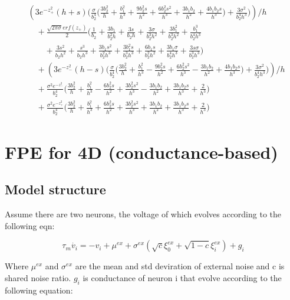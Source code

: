\documentclass{article}
\begin{document}
\begin{align}
	&(3 e^{-z_+^2}
	(h+s)
	\Big(
	\frac{\sigma}{b_2^4}
	\big(
	\frac{3 b_2^2}{h}
	+ \frac{b_1^2}{h^3}
	+ \frac{9 b_2^2 s}{h^2}
	+ \frac{6 b_2^2 s^2}{h^3}
	+ \frac{3 b_1 b_2}{h^2}
	+ \frac{4 b_1 b_2 s}{h^3}
	\big)
	+ \frac{3\sigma^2}{b_2^4 h^3}
	\Big)
	)/h
	\\[4pt]
		&\quad
	+ \frac{\sqrt{2\pi\sigma
			}erf(z_+)}
	{2}
	\Big(
	\frac{1}{b_2}
	+ \frac{3 b_1}{b_2^2 h}
	+ \frac{3 s}{b_2 h}
	+ \frac{3\sigma}{b_2^3 h^2}
	+ \frac{3 b_1^2}{b_2^3 h^2}
	+ \frac{b_1^3}{b_2^4 h^3}
	\\
	&\qquad
	+ \frac{3 s^2}{b_2 h^2}
	+ \frac{s^3}{b_2 h^3}
	+ \frac{3 b_1 s^2}{b_2^2 h^3}
	+ \frac{3 b_1^2 s}{b_2^3 h^3}
	+ \frac{6 b_1 s}{b_2^2 h^2}
	+ \frac{3 b_1 \sigma}{b_2^4 h^3}
	+ \frac{3 s\sigma}{b_2^3 h^3}
	\Big)
	\\[6pt]
		&\quad
	+ (3 e^{-z_-^2}
	(h-s)
	\Big(
	\frac{\sigma}{b_2^4}
	\big(
	\frac{3 b_2^2}{h}
	+ \frac{b_1^2}{h^3}
	- \frac{9 b_2^2 s}{h^2}
	+ \frac{6 b_2^2 s^2}{h^3}
	- \frac{3 b_1 b_2}{h^2}
	+ \frac{4 b_1 b_2 s}{h^3}
	\big)
	+ \frac{3\sigma^2}{b_2^4 h^3}
	\Big)
	)/h
	\\[6pt]
		&\quad
	+ \frac{\sigma^2 e^{-z_-^2}}{b_2^4}
	\Big(
	\frac{3 b_2^2}{h}
	+ \frac{b_1^2}{h^3}
	- \frac{6 b_2^2 s}{h^2}
	+ \frac{3 b_2^2 s^2}{h^3}
	- \frac{3 b_1 b_2}{h^2}
	+ \frac{3 b_1 b_2 s}{h^3}
	+ \frac{2}{h^3}
	\Big)
	\\[6pt]
	&\quad
	+ \frac{\sigma^2 e^{-z_+^2}}{b_2^4}
		\Big(
		\frac{3 b_2^2}{h}
		+ \frac{b_1^2}{h^3}
		+ \frac{6 b_2^2 s}{h^2}
		+ \frac{3 b_2^2 s^2}{h^3}
		+ \frac{3 b_1 b_2}{h^2}
		+ \frac{3 b_1 b_2 s}{h^3}
		+ \frac{2}{h^3}
		\Big)
\end{align}

\section{FPE for 4D (conductance-based)}
	\subsection{Model structure}
Assume there are two neurons, the voltage of which evolves according to the following eqn:

\begin{equation}
	\tau_m \dot{v_i}=-v_i+\mu^{ex}+\sigma^{ex}(\sqrt{c}\xi^{ex}_0+\sqrt{1-c}\xi_{i}^{ex})+{g_i}
\end{equation}

Where $\mu^{ex}$ and $\sigma^{ex}$ are the mean and std deviration of external noise and c is shared noise ratio. $g_i$ is conductance of neuron i that evolve according to the following equation: 
\end{document}
